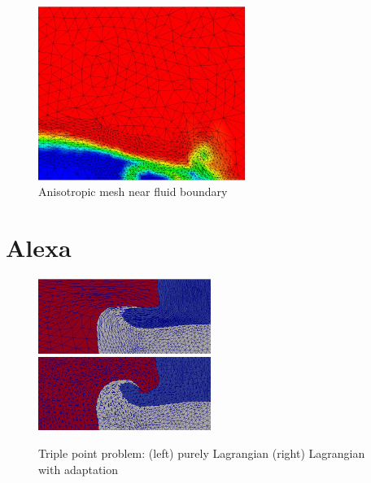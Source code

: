 \begin{figure}
\begin{center}
\includegraphics[width=0.6\textwidth]{proteus_aniso.png}
\caption{Anisotropic mesh near fluid boundary}
\label{fig:proteus_aniso}
\end{center}
\end{figure}

\section{Alexa}

\begin{figure}[t]\vspace*{4pt}
\centerline{
\includegraphics[width=0.5\textwidth]{tpp_noadapt.png}
\includegraphics[width=0.5\textwidth]{tpp_adapt.png}}
\caption{Triple point problem: (left) purely Lagrangian
(right) Lagrangian with adaptation}\vspace*{-6pt}
\label{fig:tpp}
\end{figure}

